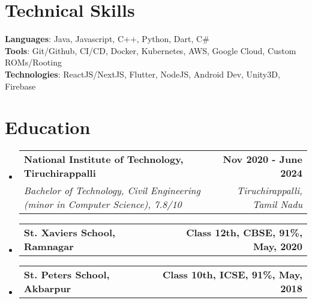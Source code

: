 \documentclass[letterpaper,11pt]{article}
\makeatletter
\newcommand{\resumeSubheading}[4]{
  \vspace{-2pt}\item
    \begin{tabular*}{1.0\textwidth}[t]{l@{\extracolsep{\fill}}r}
      \textbf{#1} & \textbf{\small #2} \\
      \textit{\small#3} & \textit{\small #4} \\
    \end{tabular*}\vspace{-8pt}
}
\newcommand{\eduSubheading}[2]{
  \vspace{-2pt}\item
    \begin{tabular*}{1.0\textwidth}[t]{l@{\extracolsep{\fill}}r}
      \textbf{#1} & \textbf{\small #2} \\
    \end{tabular*}\vspace{-8pt}
}
\newcommand{\resumeSubHeadingListStart}{\begin{itemize}[leftmargin=0.0in, label={}]}
\newcommand{\resumeSubHeadingListEnd}{\end{itemize}}
\makeatother
\begin{document}
\section{Technical Skills}
 \begin{itemize}[leftmargin=0.15in, label={}]
    \small{\item{
     \textbf{Languages}{: Java, Javascript, C++, Python, Dart, C\# } \\
     \textbf{Tools}{: Git/Github, CI/CD,  Docker, Kubernetes, AWS, Google Cloud, Custom ROMs/Rooting} \\
     \textbf{Technologies}{: ReactJS/NextJS, Flutter, NodeJS, Android Dev, Unity3D, Firebase } \\
    }}
 \end{itemize}
 \vspace{-20pt}

\section{Education}
  \resumeSubHeadingListStart
    \resumeSubheading
      {National Institute of Technology, Tiruchirappalli}{Nov 2020 - June 2024}
      {Bachelor of Technology, Civil Engineering (minor in Computer Science), 7.8/10}{Tiruchirappalli, Tamil Nadu}
  \resumeSubHeadingListEnd
  \resumeSubHeadingListStart
    \eduSubheading
      {St. Xavier\textquotesingle{}s School, Ramnagar}{Class 12th, CBSE, 91\%, May, 2020}
  \resumeSubHeadingListEnd
  \resumeSubHeadingListStart
    \eduSubheading
      {St. Peter\textquotesingle{}s School, Akbarpur}{Class 10th, ICSE, 91\%, May, 2018}
  \resumeSubHeadingListEnd
\end{document}

